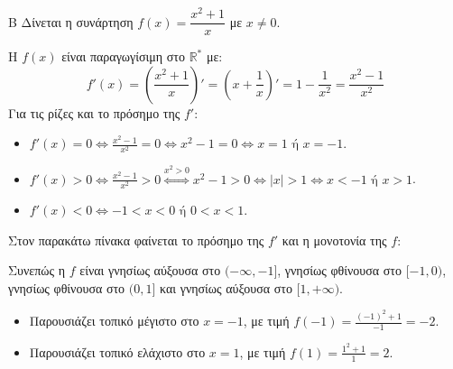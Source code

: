 \begin{thema}{Β}
Δίνεται η συνάρτηση $f(x) = \dfrac{x^2+1}{x}$ με $x \ne 0$.

\begin{erwthma}
\item Η $f(x)$ είναι παραγωγίσιμη στο $\mathbb{R}^*$ με:
\[ f'(x) = \left( \frac{x^2+1}{x} \right)' = \left( x + \frac{1}{x} \right)' = 1 - \frac{1}{x^2} = \frac{x^2-1}{x^2} \]
Για τις ρίζες και το πρόσημο της $f'$:
\begin{itemize}
    \item $f'(x) = 0 \Leftrightarrow \frac{x^2-1}{x^2} = 0 \Leftrightarrow x^2 - 1 = 0 \Leftrightarrow x = 1 \text{ ή } x = -1$.
    \item $f'(x) > 0 \Leftrightarrow \frac{x^2-1}{x^2} > 0 \stackrel{x^2>0}{\Leftrightarrow} x^2 - 1 > 0 \Leftrightarrow |x| > 1 \Leftrightarrow x < -1 \text{ ή } x > 1$.
    \item $f'(x) < 0 \Leftrightarrow -1 < x < 0 \text{ ή } 0 < x < 1$.
\end{itemize}
Στον παρακάτω πίνακα φαίνεται το πρόσημο της $f'$ και η μονοτονία της $f$:
\begin{center}
\end{center}
Συνεπώς η $f$ είναι γνησίως αύξουσα στο $(-\infty, -1]$, γνησίως φθίνουσα στο $[-1, 0)$, γνησίως φθίνουσα στο $(0, 1]$ και γνησίως αύξουσα στο $[1, +\infty)$.
\begin{itemize}
\item Παρουσιάζει τοπικό μέγιστο στο $x = -1$, με τιμή $f(-1) = \frac{(-1)^2+1}{-1} = -2$.
\item Παρουσιάζει τοπικό ελάχιστο στο $x = 1$, με τιμή $f(1) = \frac{1^2+1}{1} = 2$.
\end{itemize}


\end{erwthma}
\end{thema}
